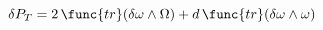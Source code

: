 \begin{equation}
\delta P_{T}=2\,\func{tr}(\delta \omega \wedge \Omega )+d\,
\func{tr}(\delta \omega \wedge \omega )  \label{eqn:dPT}
\end{equation}

